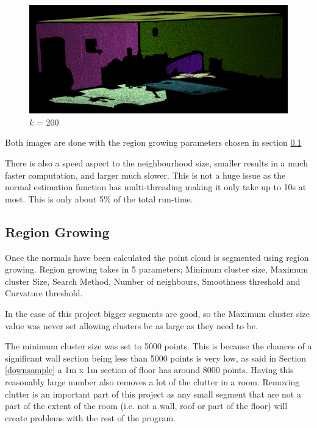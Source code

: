 		\begin{figure}[H]
			\centering
			\includegraphics[width=1\linewidth]{"Includes/images/Normal Comp/k = 200 ver 2"}
			\caption{$k$ = 200}
			\label{fig:k=200}
		\end{figure}
		
		Both images are done with the region growing parameters chosen in section \ref{RegionGrowParams}

		
		There is also a speed aspect to the neighbourhood size, smaller results in a much faster computation, and larger much slower. This is not a huge issue as the normal estimation function has multi-threading making it only take up to 10s at most. This is only about 5\% of the total run-time.
		
		
		\subsection{Region Growing}
		\label{RegionGrowParams}
			
		Once the normals have been calculated the point cloud is segmented using region growing. Region growing takes in 5 parameters; Minimum cluster size, Maximum cluster Size, Search Method, Number of neighbours, Smoothness threshold and Curvature threshold.
		
		In the case of this project bigger segments are good, so the Maximum cluster size value was never set allowing clusters be as large as they need to be.
		
		The minimum cluster size was set to 5000 points. This is because the chances of a significant wall section being less than 5000 points is very low, as said in Section \ref{downsample} a 1m x 1m section of floor has around 8000 points. Having this reasonably large number also removes a lot of the clutter in a room. Removing clutter is an important part of this project as any small segment that are not a part of the extent of the room (i.e. not a wall, roof or part of the floor) will create problems with the rest of the program.
		
